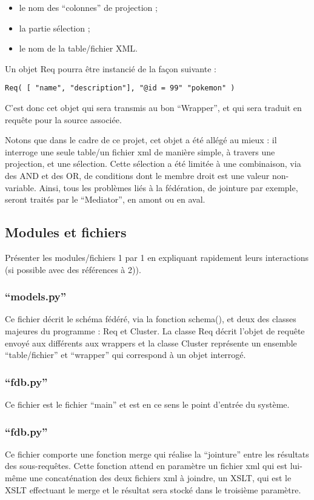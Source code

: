 \begin{itemize}
    \item le nom des “colonnes” de projection ;

    \item la partie sélection ;

    \item le nom de la table/fichier XML.
\end{itemize}

Un objet Req pourra être instancié de la façon suivante :

\lstset{language=SQL}
\begin{lstlisting}
Req( [ "name", "description"], "@id = 99" "pokemon" )
\end{lstlisting}

C’est donc cet objet qui sera transmis au bon “Wrapper”, et qui sera traduit en requête pour la source associée.

Notons que dans le cadre de ce projet, cet objet a été allégé au mieux : il interroge une seule table/un fichier xml de manière simple, à travers une projection, et une sélection. Cette sélection a été limitée à une combinaison, via des AND et des OR, de conditions dont le membre droit est une valeur non-variable. Ainsi, tous les problèmes liés à la fédération, de jointure par exemple, seront traités par le “Mediator”, en amont ou en aval.

\subsection{Modules et fichiers}

Présenter les modules/fichiers 1 par 1 en expliquant rapidement leurs interactions (si possible avec des références à 2)).

\subsubsection{“models.py”}

Ce fichier décrit le schéma fédéré, via la fonction schema(), et deux des classes majeures du programme : Req et Cluster. La classe Req décrit l’objet de requête envoyé aux différents aux wrappers et la classe Cluster représente un ensemble “table/fichier” et “wrapper” qui correspond à un objet interrogé.

\subsubsection{“fdb.py”}

Ce fichier est le fichier “main” et est en ce sens le point d’entrée du système.

\subsubsection{“fdb.py”}

Ce fichier comporte une fonction merge qui réalise la “jointure” entre les résultats des sous-requêtes. Cette fonction attend en paramètre un fichier xml qui est lui-même une concaténation des deux fichiers xml à joindre, un XSLT, qui est le XSLT effectuant le merge et le résultat sera stocké dans le troisième paramètre.
